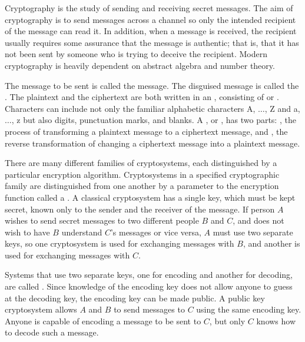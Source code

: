 
Cryptography is the study of sending and receiving secret messages.
The aim of cryptography is to send messages across a channel so only
the intended recipient of the message can read it. In addition, when a
message is received, the recipient usually requires some assurance that
the message is authentic; that is, that it has not been sent by
someone who is trying to deceive the recipient. Modern cryptography is
heavily dependent on abstract algebra and number theory. 
 
 
The message to be sent is called the  message. The disguised message is called
the . The plaintext and the
ciphertext are both written in an , consisting of  or . Characters can include not only the
familiar alphabetic characters A, $\ldots$, Z and a, $\ldots$, z but
also digits, punctuation marks, and blanks. A , or ,  has two parts: , the process
of transforming a plaintext message to a ciphertext message, and , the reverse transformation of changing a ciphertext
message into a plaintext message.
 
 
There are many different families of cryptosystems, each distinguished
by a particular encryption algorithm. Cryptosystems in a specified
cryptographic family are distinguished from one another by a parameter
to the encryption function called a . A classical cryptosystem has a single key, which must be kept
secret,  known only to the sender and the receiver of the message. If
person $A$ wishes to send secret messages to two different people $B$
and $C$, and does not wish to have $B$ understand $C$'s messages or
vice versa, $A$ must use two separate keys, so one cryptosystem is
used for exchanging messages with $B$, and another is used for
exchanging messages with $C$.
 
 
Systems that use two separate keys, one for encoding and another for
decoding, are called . Since
knowledge of the encoding key does not allow anyone to guess at the
decoding key, the encoding key can be made public. A public key
cryptosystem allows $A$ and $B$ to send messages to $C$ using the same
encoding key.  Anyone is capable of encoding a message to be sent to
$C$, but only $C$ knows how to decode such a message.
 


